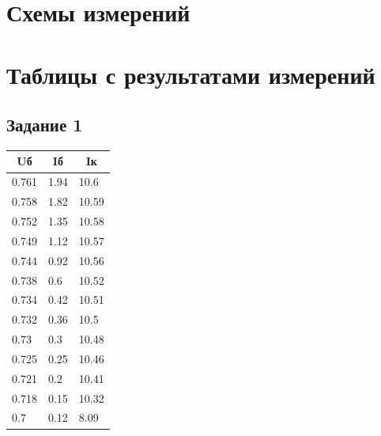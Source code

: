 \documentclass[a4paper,14pt]{article}
\begin{document}
\pagebreak

\section{Схемы измерений}

\section{Таблицы с результатами измерений}
\subsection{ Задание 1}
	\begin{table}[H]
		\begin{tabular}{|l|l|l|}
			\hline
			\multicolumn{1}{|c|}{Uб} & \multicolumn{1}{c|}{Iб} & \multicolumn{1}{c|}{Iк} \\ \hline
			0.761                    & 1.94                    & 10.6                    \\ \hline
			0.758                    & 1.82                    & 10.59                   \\ \hline
			0.752                    & 1.35                    & 10.58                   \\ \hline
			0.749                    & 1.12                    & 10.57                   \\ \hline
			0.744                    & 0.92                    & 10.56                   \\ \hline
			0.738                    & 0.6                     & 10.52                   \\ \hline
			0.734                    & 0.42                    & 10.51                   \\ \hline
			0.732                    & 0.36                    & 10.5                    \\ \hline
			0.73                     & 0.3                     & 10.48                   \\ \hline
			0.725                    & 0.25                    & 10.46                   \\ \hline
			0.721                    & 0.2                     & 10.41                   \\ \hline
			0.718                    & 0.15                    & 10.32                   \\ \hline
			0.7                      & 0.12                    & 8.09                    \\ \hline

\end{tabular}
\end{table}
\end{document}
